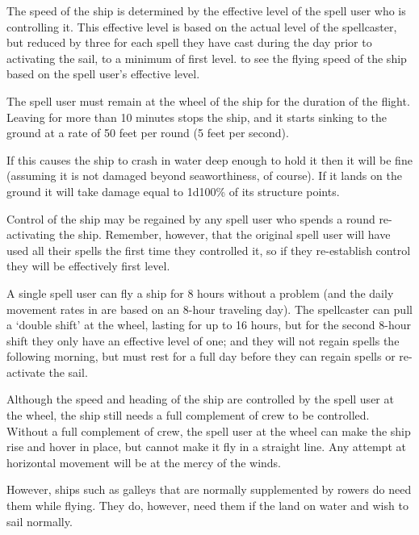 \begin{multicols*}{2}
The speed of the ship is determined by the effective level of the spell user who is controlling it. This effective level is based on the actual level of the spellcaster, but reduced by three for each spell they have cast during the day prior to activating the sail, to a minimum of first level.  to see the flying speed of the ship based on the spell user’s effective level.

The spell user must remain at the wheel of the ship for the duration of the flight. Leaving for more than 10 minutes stops the ship, and it starts sinking to the ground at a rate of 50 feet per round (5 feet per second).

If this causes the ship to crash in water deep enough to hold it then it will be fine (assuming it is not damaged beyond seaworthiness, of course). If it lands on the ground it will take damage equal to 1d100\% of its structure points.

Control of the ship may be regained by any spell user who spends a round re-activating the ship. Remember, however, that the original spell user will have used all their spells the first time they controlled it, so if they re-establish control they will be effectively first level.

A single spell user can fly a ship for 8 hours without a problem (and the daily movement rates in  are based on an 8-hour traveling day). The spellcaster can pull a ‘double shift’ at the wheel, lasting for up to 16 hours, but for the second 8-hour shift they only have an effective level of one; and they will not regain spells the following morning, but must rest for a full day before they can regain spells or re-activate the sail.

Although the speed and heading of the ship are controlled by the spell user at the wheel, the ship still needs a full complement of crew to be controlled. Without a full complement of crew, the spell user at the wheel can make the ship rise and hover in place, but cannot make it fly in a straight line. Any attempt at horizontal movement will be at the mercy of the winds.

However, ships such as galleys that are normally supplemented by rowers do need them while flying. They do, however, need them if the land on water and wish to sail normally.


\end{multicols*}
